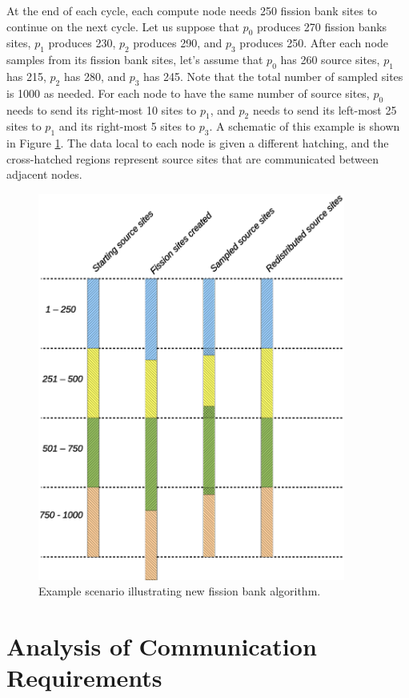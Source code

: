 At the end of each cycle, each compute node needs 250 fission bank
sites to continue on the next cycle. Let us suppose that $p_0$
produces 270 fission banks sites, $p_1$ produces 230, $p_2$ produces
290, and $p_3$ produces 250. After each node samples from its fission
bank sites, let's assume that $p_0$ has 260 source sites, $p_1$ has
215, $p_2$ has 280, and $p_3$ has 245. Note that the total number of
sampled sites is 1000 as needed. For each node to have the same number
of source sites, $p_0$ needs to send its right-most 10 sites to $p_1$,
and $p_2$ needs to send its left-most 25 sites to $p_1$ and its
right-most 5 sites to $p_3$. A schematic of this example is shown in
Figure \ref{fig:algorithm-new}. The data local to each node is given a
different hatching, and the cross-hatched regions represent source
sites that are communicated between adjacent nodes.
\begin{figure}[ht]
  \centering
  \includegraphics[width=0.9\textwidth]{figures/algorithm_schematic/algorithm-new.eps}
  \caption{Example scenario illustrating new fission bank algorithm.}
  \label{fig:algorithm-new}
\end{figure}


\section{Analysis of Communication Requirements}
\label{sec:analysis}

